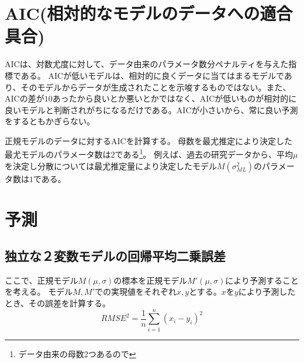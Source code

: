 \section{AIC(相対的なモデルのデータへの適合具合)}
AICは、対数尤度に対して、データ由来のパラメータ数分ペナルティを与えた指標である。
AICが低いモデルは、相対的に良くデータに当てはまるモデルであり、そのモデルからデータが生成されたことを示唆するものではない。また、AICの差が$10$あったから良いとか悪いとかではなく、AICが低いものが相対的に良いモデルと判断されがちになるだけである。AICが小さいから、常に良い予測をするともかぎらない。

正規モデルのデータに対するAICを計算する。
母数を最尤推定により決定した最尤モデルのパラメータ数は2である\footnote{データ由来の母数2つあるので}。
例えば、過去の研究データから、平均$\mu$を決定し分散については最尤推定量により決定したモデル$M(\sigma^2_{ML})$のパラメータ数は$1$である。



\section{予測}

\subsection{独立な２変数モデルの回帰平均二乗誤差}\label{null_model}
ここで、正規モデル$M(\mu,\sigma)$の標本を正規モデル$M'(\mu,\sigma)$により予測することを考える。
モデル$M,M'$での実現値をそれぞれ$x,y$とする。$x$を$y$により予測したとき、その誤差を計算する。
\begin{equation*}
 RMSE^2 = \frac{1}{n}\sum_{i=1}^n (x_i-y_i)^2
\end{equation*}

